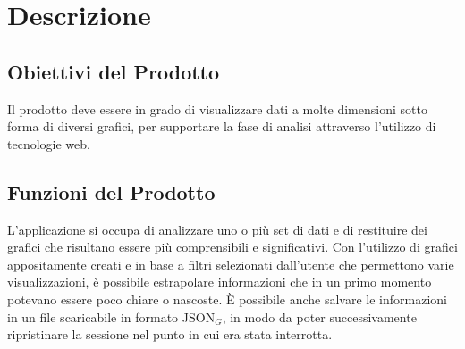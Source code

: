 \chapter{Descrizione}

\section{Obiettivi del Prodotto}
Il prodotto deve essere in grado di visualizzare dati a molte dimensioni sotto forma di diversi grafici, per supportare la fase di analisi attraverso l'utilizzo di tecnologie web.

\section{Funzioni del Prodotto}
L'applicazione si occupa di analizzare uno o più set di dati e di restituire dei grafici che risultano essere più comprensibili e significativi.
Con l'utilizzo di grafici appositamente creati e in base a filtri selezionati dall'utente che permettono varie visualizzazioni, è possibile estrapolare informazioni che in un primo momento potevano essere poco chiare o nascoste.
È possibile anche salvare le informazioni in un file scaricabile in formato JSON$_G$, in modo da poter successivamente ripristinare la sessione nel punto in cui era stata interrotta.
